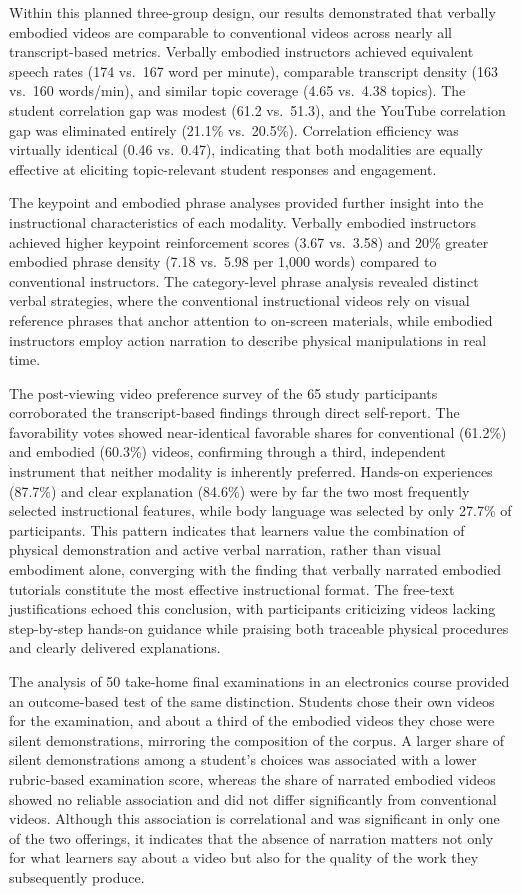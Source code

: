 \documentclass[fleqn,10pt]{JLA_article} %
\begin{document}
Within this planned three-group design, our results demonstrated that verbally embodied videos are comparable to conventional videos across nearly all transcript-based metrics. Verbally embodied instructors achieved equivalent speech rates (174 vs.\ 167 word per minute), comparable transcript density (163 vs.\ 160 words/min), and similar topic coverage (4.65 vs.\ 4.38 topics). The student correlation gap was modest (61.2 vs.\ 51.3), and the YouTube correlation gap was eliminated entirely (21.1\% vs.\ 20.5\%). Correlation efficiency was virtually identical (0.46 vs.\ 0.47), indicating that both modalities are equally effective at eliciting topic-relevant student responses and engagement.

The keypoint and embodied phrase analyses provided further insight into the instructional characteristics of each modality. Verbally embodied instructors achieved higher keypoint reinforcement scores (3.67 vs.\ 3.58) and 20\% greater embodied phrase density (7.18 vs.\ 5.98 per 1{,}000 words) compared to conventional instructors. The category-level phrase analysis revealed distinct verbal strategies, where the conventional instructional videos rely on visual reference phrases that anchor attention to on-screen materials, while embodied instructors employ action narration to describe physical manipulations in real time.

The post-viewing video preference survey of the 65 study participants corroborated the transcript-based findings through direct self-report. The favorability votes showed near-identical favorable shares for conventional (61.2\%) and embodied (60.3\%) videos, confirming through a third, independent instrument that neither modality is inherently preferred. Hands-on experiences (87.7\%) and clear explanation (84.6\%) were by far the two most frequently selected instructional features, while body language was selected by only 27.7\% of participants. This pattern indicates that learners value the combination of physical demonstration and active verbal narration, rather than visual embodiment alone, converging with the finding that verbally narrated embodied tutorials constitute the most effective instructional format. The free-text justifications echoed this conclusion, with participants criticizing videos lacking step-by-step hands-on guidance while praising both traceable physical procedures and clearly delivered explanations.

The analysis of 50 take-home final examinations in an electronics course provided an outcome-based test of the same distinction. Students chose their own videos for the examination, and about a third of the embodied videos they chose were silent demonstrations, mirroring the composition of the corpus. A larger share of silent demonstrations among a student's choices was associated with a lower rubric-based examination score, whereas the share of narrated embodied videos showed no reliable association and did not differ significantly from conventional videos. Although this association is correlational and was significant in only one of the two offerings, it indicates that the absence of narration matters not only for what learners say about a video but also for the quality of the work they subsequently produce.
\end{document}
